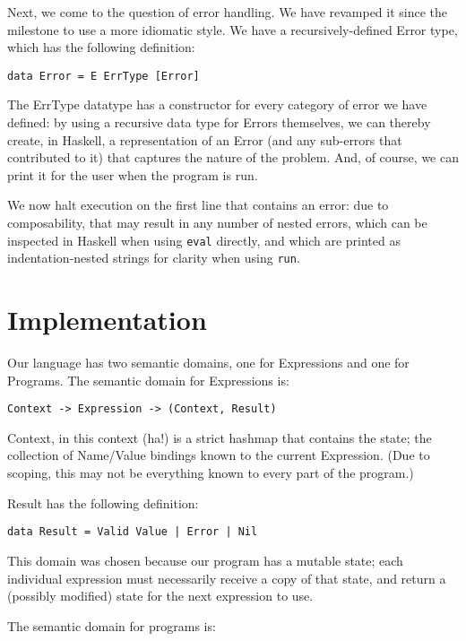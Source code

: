\documentclass{article}
\begin{document}
Next, we come to the question of error handling.  We have revamped it since the milestone to use a more idiomatic style.  We have a recursively-defined Error type, which has the following definition:

\begin{lstlisting}
data Error = E ErrType [Error]
\end{lstlisting}

The ErrType datatype has a constructor for every category of error we have defined: by using a recursive data type for Errors themselves, we can thereby create, in Haskell, a representation of an Error (and any sub-errors that contributed to it) that captures the nature of the problem.  And, of course, we can print it for the user when the program is run.

We now halt execution on the first line that contains an error: due to composability, that may result in any number of nested errors, which can be inspected in Haskell when using \texttt{eval} directly, and which are printed as indentation-nested strings for clarity when using \texttt{run}.

\section*{Implementation}

Our language has two semantic domains, one for Expressions and one for Programs.  The semantic domain for Expressions is:

\begin{lstlisting}
Context -> Expression -> (Context, Result)
\end{lstlisting}

Context, in this context (ha!) is a strict hashmap that contains the state; the collection of Name/Value bindings known to the current Expression.  (Due to scoping, this may not be everything known to every part of the program.)

Result has the following definition:

\begin{lstlisting}
data Result = Valid Value | Error | Nil
\end{lstlisting}

This domain was chosen because our program has a mutable state; each individual expression must necessarily receive a copy of that state, and return a (possibly modified) state for the next expression to use.

The semantic domain for programs is:
\end{document}
